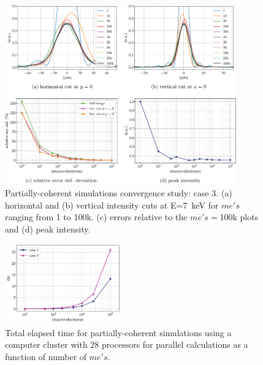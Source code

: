 \documentclass{iucr}              %
\begin{document}
\begin{figure}
    \centering
    \includegraphics[width=10cm]{figures/c3.pdf}
    \caption{Partially-coherent simulations convergence study: case 3. (a) horizontal and (b) vertical intensity cuts at E=7~keV for $me's$ ranging from 1 to 100k. (c) errors relative to the $me's=$100k plots and (d) peak intensity.}
    \label{fig:me_c3}
\end{figure}

\begin{figure}
    \centering
    \includegraphics[width=5cm]{figures/srw_time.pdf}
    \caption{Total elapsed time for partially-coherent simulations using a computer cluster with 28 processors for parallel calculations as a function of number of $me's$.}
    \label{fig:me_t}
\end{figure}

\newpage



\end{document}
